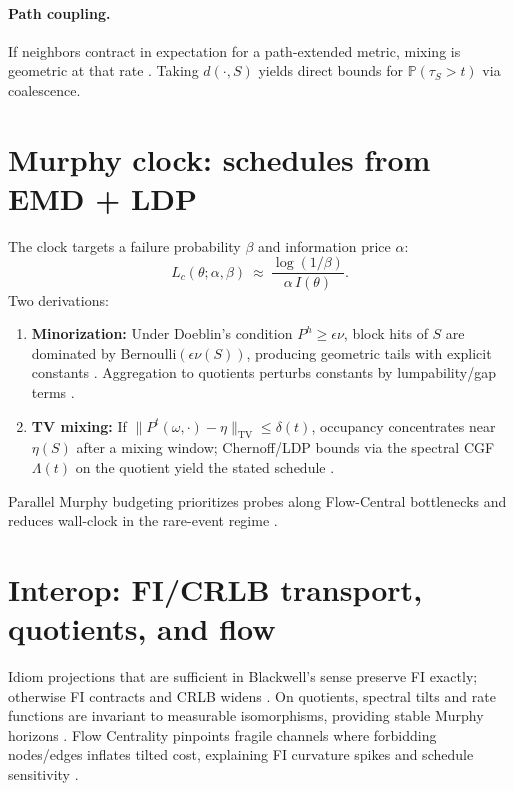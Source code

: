 \documentclass[11pt]{article}
\newcommand{\Prob}{\mathbb{P}}
\newcommand{\TV}{\mathrm{TV}}
\newcommand{\1}{\mathbbm{1}}
\begin{document}
\paragraph{Path coupling.}
If neighbors contract in expectation for a path-extended metric, mixing is geometric at that rate \parencite{BubleyDyer1997}. Taking $d(\cdot,S)$ yields direct bounds for $\Prob(\tau_S>t)$ via coalescence.

\section{Murphy clock: schedules from EMD + LDP}\label{sec:murphy}
The clock targets a failure probability $\beta$ and information price $\alpha$:
\[
L_c(\theta;\alpha,\beta)\ \approx\ \frac{\log(1/\beta)}{\alpha\, I(\theta)}.
\]
Two derivations:
\begin{enumerate}[leftmargin=1.25em]
\item \textbf{Minorization:} Under Doeblin’s condition $P^h\ge \epsilon \nu$, block hits of $S$ are dominated by Bernoulli$(\epsilon \nu(S))$, producing geometric tails with explicit constants \parencite[Ch.~16]{MeynTweedie2009}. Aggregation to quotients perturbs constants by lumpability/gap terms \parencite{elliott2025qfi}.
\item \textbf{TV mixing:} If $\|P^t(\omega,\cdot)-\eta\|_{\TV}\le \delta(t)$, occupancy concentrates near $\eta(S)$ after a mixing window; Chernoff/LDP bounds via the spectral CGF $\Lambda(t)$ on the quotient yield the stated schedule \parencite{LevinPeresWilmer2009,DemboZeitouni1998,elliott2025qfi}.
\end{enumerate}
Parallel Murphy budgeting prioritizes probes along Flow-Central bottlenecks and reduces wall-clock in the rare-event regime \parencite{elliott2025pmb,elliott2025flow,Freeman1977,Newman2005}.

\section{Interop: FI/CRLB transport, quotients, and flow}\label{sec:interop}
Idiom projections that are sufficient in Blackwell’s sense preserve FI exactly; otherwise FI contracts and CRLB widens \parencite{Blackwell1953,AmariNagaoka2000,Cencov1982}. On quotients, spectral tilts and rate functions are invariant to measurable isomorphisms, providing stable Murphy horizons \parencite{elliott2025qfi,DemboZeitouni1998}. Flow Centrality pinpoints fragile channels where forbidding nodes/edges inflates tilted cost, explaining FI curvature spikes and schedule sensitivity \parencite{elliott2025flow,Freeman1977,Newman2005}.
\end{document}
